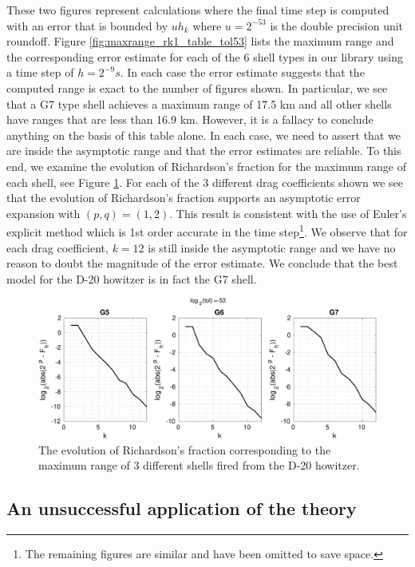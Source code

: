 \documentclass[runningheads]{llncs}
\begin{document}
These two figures represent calculations where the final time step is computed with an error that is bounded by $u h_{k}$ where $u = 2^{-53}$ is the double precision unit roundoff. Figure \ref{fig:maxrange_rk1_table_tol53} lists the maximum range and the corresponding error estimate for each of the 6 shell types in our library using a time step of $h = 2^{-9} s$. In each case the error estimate suggests that the computed range is exact to the number of figures shown. In particular, we see that a G7 type shell achieves a maximum range of 17.5 km and all other shells have ranges that are less than 16.9 km. However, it is a fallacy to conclude anything on the basis of this table alone. In each case, we need to assert that we are inside the asymptotic range and that the error estimates are reliable. To this end, we examine the evolution of Richardson's fraction for the maximum range of each shell, see Figure \ref{fig:maxrange_rk1_fraction_tol53}. For each of the 3 different drag coefficients shown we see that the evolution of Richardson's fraction supports an asymptotic error expansion with $(p,q) = (1,2)$. This result is consistent with the use of Euler's explicit method which is 1st order accurate in the time step\footnote{The remaining figures are similar and have been omitted to save space.}. We observe that for each drag coefficient, $k=12$ is still inside the asymptotic range and we have no reason to doubt the magnitude of the error estimate. We conclude that the best model for the D-20 howitzer is in fact the G7 shell.

\begin{figure}[t!]
  \centering
  \includegraphics[width=\linewidth]{maxrange_rk1_tol53.pdf}
  \caption{The evolution of Richardson's fraction corresponding to the maximum range of 3 different shells fired from the D-20 howitzer.} \label{fig:maxrange_rk1_fraction_tol53}
\end{figure}

\subsection{An unsuccessful application of the theory}
\end{document}
